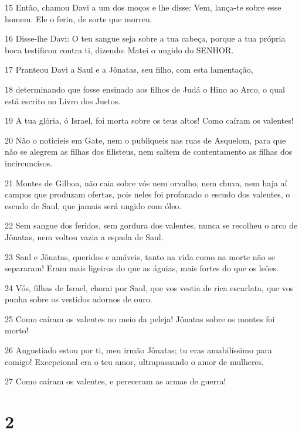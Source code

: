 \par 15 Então, chamou Davi a um dos moços e lhe disse: Vem, lança-te sobre esse homem. Ele o feriu, de sorte que morreu.
\par 16 Disse-lhe Davi: O teu sangue seja sobre a tua cabeça, porque a tua própria boca testificou contra ti, dizendo: Matei o ungido do SENHOR.
\par 17 Pranteou Davi a Saul e a Jônatas, seu filho, com esta lamentação,
\par 18 determinando que fosse ensinado aos filhos de Judá o Hino ao Arco, o qual está escrito no Livro dos Justos.
\par 19 A tua glória, ó Israel, foi morta sobre os teus altos! Como caíram os valentes!
\par 20 Não o noticieis em Gate, nem o publiqueis nas ruas de Asquelom, para que não se alegrem as filhas dos filisteus, nem saltem de contentamento as filhas dos incircuncisos.
\par 21 Montes de Gilboa, não caia sobre vós nem orvalho, nem chuva, nem haja aí campos que produzam ofertas, pois neles foi profanado o escudo dos valentes, o escudo de Saul, que jamais será ungido com óleo.
\par 22 Sem sangue dos feridos, sem gordura dos valentes, nunca se recolheu o arco de Jônatas, nem voltou vazia a espada de Saul.
\par 23 Saul e Jônatas, queridos e amáveis, tanto na vida como na morte não se separaram! Eram mais ligeiros do que as águias, mais fortes do que os leões.
\par 24 Vós, filhas de Israel, chorai por Saul, que vos vestia de rica escarlata, que vos punha sobre os vestidos adornos de ouro.
\par 25 Como caíram os valentes no meio da peleja! Jônatas sobre os montes foi morto!
\par 26 Angustiado estou por ti, meu irmão Jônatas; tu eras amabilíssimo para comigo! Excepcional era o teu amor, ultrapassando o amor de mulheres.
\par 27 Como caíram os valentes, e pereceram as armas de guerra!

\chapter{2}

